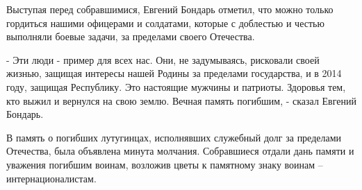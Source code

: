 Выступая перед собравшимися, Евгений Бондарь отметил, что можно только
гордиться нашими офицерами и солдатами, которые с доблестью и честью выполняли
боевые задачи, за пределами своего Отечества.

- Эти люди - пример для всех нас. Они, не задумываясь, рисковали своей жизнью,
защищая интересы нашей Родины за пределами государства, и в 2014 году, защищая
Республику. Это настоящие мужчины и патриоты. Здоровья тем, кто выжил и
вернулся на свою землю. Вечная память погибшим, - сказал Евгений Бондарь.

В память о погибших лутугинцах, исполнявших служебный долг за пределами
Отечества, была объявлена минута молчания. Собравшиеся отдали дань памяти и
уважения погибшим воинам, возложив цветы к памятному знаку воинам –
интернационалистам.

